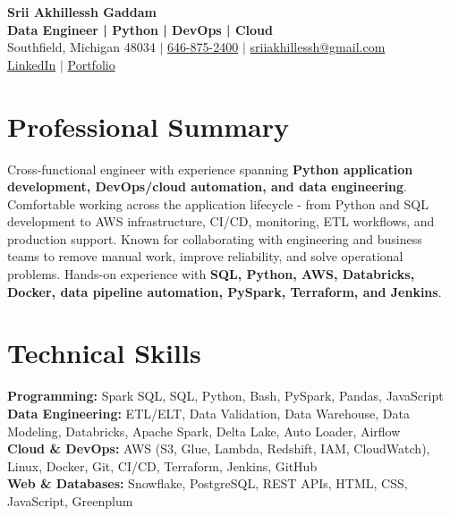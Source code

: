 \documentclass[letterpaper,10pt]{article}
\begin{document}
\fontsize{9.35pt}{10.45pt}\selectfont

\begin{center}
    {\LARGE \textbf{Srii Akhillessh Gaddam}} \\[-1pt]
    \textbf{Data Engineer | Python | DevOps | Cloud} \\[2pt]
    Southfield, Michigan 48034 $|$
    \href{tel:6468752400}{646-875-2400} $|$
    \href{mailto:sriiakhillessh@gmail.com}{sriiakhillessh@gmail.com} \\[1pt]
    \href{https://www.linkedin.com/in/srii-akhiilessh-gaddam-b48668191/}{LinkedIn} $|$
    \href{https://sriiakhillesshg.github.io/portfolio/}{Portfolio}
\end{center}
\vspace{-8pt}

\section{Professional Summary}
\small{Cross-functional engineer with experience spanning \textbf{Python application development, DevOps/cloud automation, and data engineering}. Comfortable working across the application lifecycle - from Python and SQL development to AWS infrastructure, CI/CD, monitoring, ETL workflows, and production support. Known for collaborating with engineering and business teams to remove manual work, improve reliability, and solve operational problems. Hands-on experience with \textbf{SQL, Python, AWS, Databricks, Docker, data pipeline automation, PySpark, Terraform, and Jenkins}.}

\section{Technical Skills}
\small{
\textbf{Programming:} Spark SQL, SQL, Python, Bash, PySpark, Pandas, JavaScript \\
\textbf{Data Engineering:} ETL/ELT, Data Validation, Data Warehouse, Data Modeling, Databricks, Apache Spark, Delta Lake, Auto Loader, Airflow \\
\textbf{Cloud \& DevOps:} AWS (S3, Glue, Lambda, Redshift, IAM, CloudWatch), Linux, Docker, Git, CI/CD, Terraform, Jenkins, GitHub \\
\textbf{Web \& Databases:} Snowflake, PostgreSQL, REST APIs, HTML, CSS, JavaScript, Greenplum
}
\end{document}
